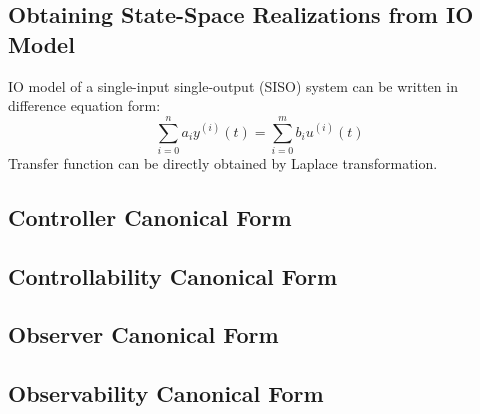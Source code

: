 \documentclass[10pt,a4paper,oneside]{article}
\begin{document}
\subsection{Obtaining State-Space Realizations from IO Model}
IO model of a single-input single-output (SISO) system can be written in difference equation form:
\[
\sum_{i=0}^{n} a_i y^{(i)}(t) = \sum_{i=0}^{m} b_i u^{(i)}(t)
\]
Transfer function can be directly obtained by Laplace transformation.

\subsection{Controller Canonical Form}


\subsection{Controllability Canonical Form}


\subsection{Observer Canonical Form}


\subsection{Observability Canonical Form}
\end{document}
